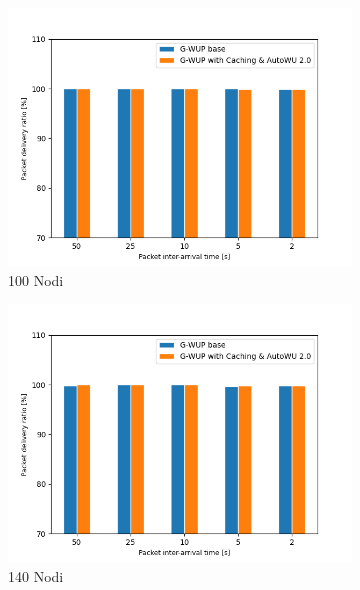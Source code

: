 \begin{figure}[h!]
  \begin{subfigure}[t]{0.329\linewidth}
    \includegraphics[width=1.13\linewidth]{Contents/Images/graphs/analisi_final2.0/pdr/pdr_100.png}
    \caption{100 Nodi}
  \end{subfigure}
  \begin{subfigure}[t]{0.329\linewidth}
    \includegraphics[width=1.13\linewidth]{Contents/Images/graphs/analisi_final2.0/pdr/pdr_140.png}
    \caption{140 Nodi}
  \end{subfigure}
  \begin{subfigure}[t]{0.329\linewidth}

\end{subfigure}
\end{figure}
